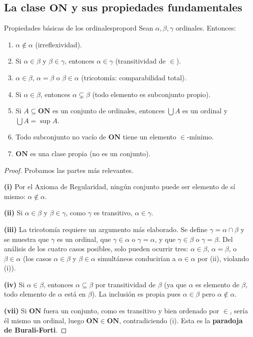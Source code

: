 \subsection{La clase $\mathbf{ON}$ y sus propiedades fundamentales}

\begin{teorema}{Propiedades básicas de los ordinales}{propord}
Sean $\alpha, \beta, \gamma$ ordinales. Entonces:
\begin{enumerate}[leftmargin=2em, label=(\roman*)]
  \item $\alpha \notin \alpha$ \quad (irreflexividad).
  \item Si $\alpha \in \beta$ y $\beta \in \gamma$, entonces $\alpha \in \gamma$ \quad (transitividad de $\in$).
  \item $\alpha \in \beta$, $\alpha = \beta$ o $\beta \in \alpha$ \quad (tricotomía: comparabilidad total).
  \item Si $\alpha \in \beta$, entonces $\alpha \subsetneq \beta$ \quad (todo elemento es subconjunto propio).
  \item Si $A \subseteq \mathbf{ON}$ es un conjunto de ordinales, entonces $\bigcup A$ es un ordinal y $\bigcup A = \sup A$.
  \item Todo subconjunto no vacío de $\mathbf{ON}$ tiene un elemento $\in$-mínimo.
  \item $\mathbf{ON}$ es una clase propia (no es un conjunto).
\end{enumerate}
\end{teorema}

\begin{proof}
Probamos las partes más relevantes.

\textbf{(i)} Por el Axioma de Regularidad, ningún conjunto puede ser elemento de sí mismo: $\alpha \notin \alpha$.

\textbf{(ii)} Si $\alpha \in \beta$ y $\beta \in \gamma$, como $\gamma$ es transitivo, $\alpha \in \gamma$.

\textbf{(iii)} La tricotomía requiere un argumento más elaborado. Se define $\gamma = \alpha \cap \beta$ y se muestra que $\gamma$ es un ordinal, que $\gamma \in \alpha$ o $\gamma = \alpha$, y que $\gamma \in \beta$ o $\gamma = \beta$. Del análisis de los cuatro casos posibles, solo pueden ocurrir tres: $\alpha \in \beta$, $\alpha = \beta$, o $\beta \in \alpha$ (los casos $\alpha \in \beta$ y $\beta \in \alpha$ simultáneos conducirían a $\alpha \in \alpha$ por (ii), violando (i)).

\textbf{(iv)} Si $\alpha \in \beta$, entonces $\alpha \subseteq \beta$ por transitividad de $\beta$ (ya que $\alpha$ es elemento de $\beta$, todo elemento de $\alpha$ está en $\beta$). La inclusión es propia pues $\alpha \in \beta$ pero $\alpha \notin \alpha$.

\textbf{(vii)} Si $\mathbf{ON}$ fuera un conjunto, como es transitivo y bien ordenado por $\in$, sería él mismo un ordinal, luego $\mathbf{ON} \in \mathbf{ON}$, contradiciendo (i). Esta es la \textbf{paradoja de Burali-Forti}.
\end{proof}

